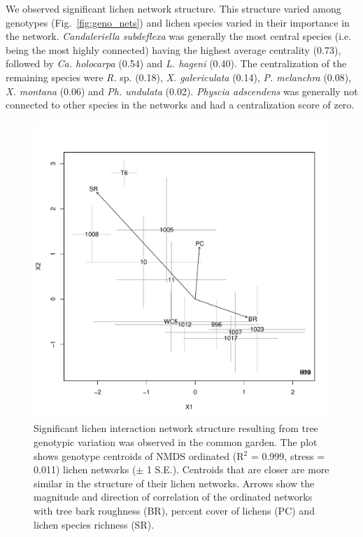 \documentclass[9pt,twocolumn,twoside,lineno]{pnas-new}
\begin{document}
{We observed significant lichen network structure. This structure
varied among genotypes (Fig.~\ref{fig:geno_nets}) and lichen species
varied in their importance in the network. \textit{Candaleriella
  subdeflexa} was generally the most central species (i.e. being the
most highly connected) having the highest average centrality (0.73),
followed by \textit{Ca. holocarpa} (0.54) and \textit{L. hageni}
(0.40). The centralization of the remaining species were \textit{R.}
sp. (0.18), \textit{X. galericulata} (0.14), \textit{P. melanchra}
(0.08), \textit{X. montana} (0.06) and \textit{Ph. undulata}
(0.02). \textit{Physcia adscendens} was generally not connected to
other species in the networks and had a centralization score of zero.

\begin{figure}[ht]
\centering
\includegraphics[width=\linewidth]{cn_chplot.pdf}
\caption{Significant lichen interaction network structure resulting
  from tree genotypic variation was observed in the common garden.
  The plot shows genotype centroids of NMDS ordinated (R$^2$ = 0.999,
  stress = 0.011) lichen networks ($\pm$ 1 S.E.). Centroids that are
  closer are more similar in the structure of their lichen
  networks. Arrows show the magnitude and direction of correlation of
  the ordinated networks with tree bark roughness (BR), percent cover
  of lichens (PC) and lichen species richness (SR).}
\label{fig:cn_ch_plot}
\end{figure}


}
\end{document}
